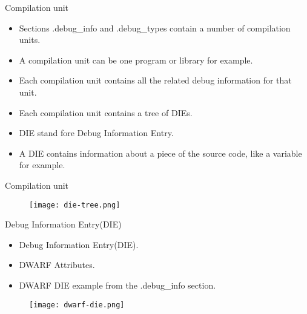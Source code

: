 
\begin{frame}{Compilation unit}
	\begin{itemize}
		\item Sections .debug\_info and .debug\_types contain a number of compilation units.
		\item A compilation unit can be one program or library for example.
		\item Each compilation unit contains all the related debug information for that unit.
		\item Each compilation unit contains a tree of DIEs.
		\item DIE stand fore Debug Information Entry.
		\item A DIE contains information about a piece of the source code, like a variable for example.
	\end{itemize}
\end{frame}


\begin{frame}{Compilation unit}
	\begin{figure}
		\texttt{[image: die-tree.png]}
	\end{figure}
\end{frame}


\begin{frame}{Debug Information Entry(DIE)}
	\begin{itemize}
	    \item Debug Information Entry(DIE).
	    \item DWARF Attributes.
	    \item DWARF DIE example from the .debug\_info section.
	\end{itemize}
	\begin{figure}
		\texttt{[image: dwarf-die.png]}
	\end{figure}
\end{frame}


